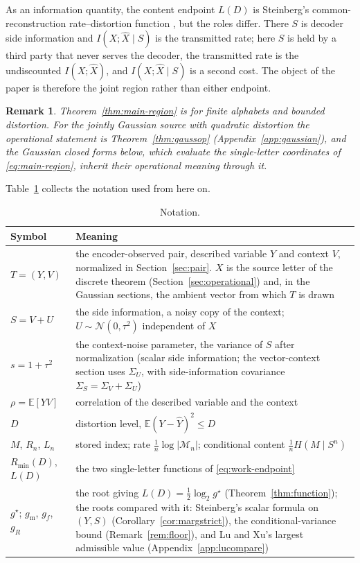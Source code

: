 \documentclass[11pt,onecolumn]{IEEEtran}
\newtheorem{remark}[theorem]{Remark}
\newcommand{\E}{\mathbb{E}}
\newcommand{\hX}{\widehat{X}}
\newcommand{\hY}{\widehat{Y}}
\begin{document}
As an information quantity, the content endpoint $L(D)$ is Steinberg's
common-reconstruction rate--distortion function \cite{steinberg2009}, but
the roles differ. There $S$ is decoder side information and
$I(X;\hX\mid S)$ is the transmitted rate; here $S$ is held by a third
party that never serves the decoder, the transmitted rate is the
undiscounted $I(X;\hX)$, and $I(X;\hX\mid S)$ is a second cost. The
object of the paper is therefore the joint region rather than either
endpoint.

\begin{remark}\label{rem:scope}
Theorem~\ref{thm:main-region} is for finite alphabets and bounded
distortion. For the jointly Gaussian source with quadratic distortion the
operational statement is Theorem~\ref{thm:gaussop}
(Appendix~\ref{app:gaussian}), and the Gaussian closed forms below,
which evaluate the single-letter coordinates of \eqref{eq:main-region},
inherit their operational meaning through it.
\end{remark}

Table~\ref{tab:notation} collects the notation used from here on.

\begin{table}[!t]
\caption{Notation.}
\label{tab:notation}
\centering
\footnotesize
\begin{tabular}{p{1.35in}p{4.55in}}
\hline
Symbol & Meaning\\
\hline
$T=(Y,V)$ & the encoder-observed pair, described variable $Y$ and
context $V$, normalized in Section~\ref{sec:pair}. $X$ is the source letter of
the discrete theorem (Section~\ref{sec:operational}) and, in the Gaussian
sections, the ambient vector from which $T$ is drawn\\
$S=V+U$ & the side information, a noisy copy of the context; $U\sim\mathcal N(0,\tau^2)$
independent of $X$\\
$s=1+\tau^2$ & the context-noise parameter, the variance of $S$ after
normalization (scalar side information;
the vector-context section uses $\Sigma_U$, with side-information
covariance $\Sigma_S=\Sigma_V+\Sigma_U$)\\
$\rho=\E[YV]$ & correlation of the described variable and the context\\
$D$ & distortion level, $\E(Y-\hY)^2\le D$\\
$M$, $R_n$, $L_n$ & stored index; rate $\tfrac1n\log|\mathcal M_n|$;
conditional content $\tfrac1n H(M\mid S^n)$\\
$R_{\min}(D)$, $L(D)$ & the two single-letter functions of
\eqref{eq:work-endpoint}\\
$g^\star$; $g_{\mathrm m}$, $g_f$, $g_R$ & the root giving
$L(D)=\tfrac12\log_2 g^\star$ (Theorem~\ref{thm:function}); the roots
compared with it: Steinberg's scalar formula on $(Y,S)$
(Corollary~\ref{cor:margstrict}), the conditional-variance bound
(Remark~\ref{rem:floor}), and Lu and Xu's largest admissible value
(Appendix~\ref{app:lucompare})\\
\hline
\end{tabular}
\end{table}
\end{document}
